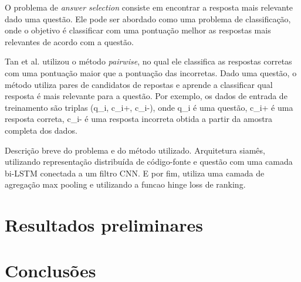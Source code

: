 \documentclass[12pt]{article}
\begin{document}
O problema de \textit{answer selection} consiste em encontrar a resposta mais relevante dado uma questão. Ele pode ser abordado como uma problema de classificação, onde
o objetivo é classificar com uma pontuação melhor as respostas mais relevantes de acordo com a questão.

Tan et al. utilizou o método \textit{pairwise}, no qual ele classifica as respostas corretas com uma pontuação maior que a pontuação das incorretas. Dado uma questão,
o método utiliza pares de candidatos de repostas e aprende a classificar qual resposta é mais relevante para a questão. Por exemplo, os dados de entrada de treinamento
são triplas (q\_i, c\_i+, c\_i-), onde q\_i é uma questão, c\_i+ é uma resposta correta, c\_i- é uma resposta incorreta obtida a partir da amostra completa dos dados. 


 
Descrição breve do problema e do método utilizado. Arquitetura siamês, utilizando representação distribuída de código-fonte e questão com uma camada bi-LSTM conectada a um filtro CNN. E por fim, utiliza uma camada de agregação max pooling e utilizando a funcao hinge loss de ranking.

\section{Resultados preliminares}\label{sec:resultados-preliminares}




\section{Conclusões}





\end{document}
